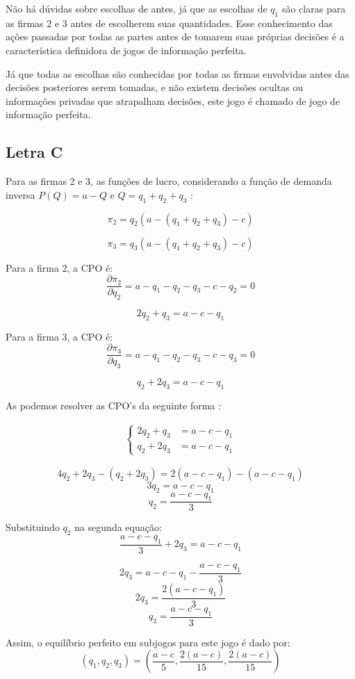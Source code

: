 \documentclass[a4paper,12pt]{article}[abntex2]
\begin{document}
Não há dúvidas sobre escolhas de antes, já que as escolhas de \( q_1 \) são claras para as firmas 2 e 3 antes de escolherem suas quantidades. Esse conhecimento das ações passadas por todas as partes antes de tomarem suas próprias decisões é a característica definidora de jogos de informação perfeita.

Já que todas as escolhas são conhecidas por todas as firmas envolvidas antes das decisões posteriores serem tomadas, e não existem decisões ocultas ou informações privadas que atrapalham decisões, este jogo é chamado de jogo de informação perfeita.

\subsection{\textbf{Letra C}}
Para as firmas 2 e 3, as funções de lucro, considerando a função de demanda inversa \(P(Q) = a - Q\) e \(Q = q_1 + q_2 + q_3\) :

\[\pi_2 = q_2 \left(a - (q_1 + q_2 + q_3) - c\right)\]

\[\pi_3 = q_3 \left(a - (q_1 + q_2 + q_3) - c\right)\]

Para a firma 2, a CPO é:
\[\frac{\partial \pi_2}{\partial q_2} = a - q_1 - q_2 - q_3 - c - q_2 = 0\]

\[2q_2 + q_3 = a - c - q_1\]

Para a firma 3, a CPO é:
\[\frac{\partial \pi_3}{\partial q_3} = a - q_1 - q_2 - q_3 - c - q_3 = 0\]

\[q_2 + 2q_3 = a - c - q_1\]

As podemos resolver as CPO's da seguinte forma : 

\begin{align}
\left\{
\begin{array}{ll}
2q_2 + q_3 &= a - c - q_1 \\
q_2 + 2q_3 &= a - c - q_1
\end{array}
\right.
\end{align}


\[4q_2 + 2q_3 - (q_2 + 2q_3) = 2(a - c - q_1) - (a - c - q_1)\]
\[3q_2 = a - c - q_1\]
\[q_2 = \frac{a - c - q_1}{3}\]

Substituindo \(q_2\) na segunda equação:
\[\frac{a - c - q_1}{3} + 2q_3 = a - c - q_1\]

\[2q_3 = a - c - q_1 - \frac{a - c - q_1}{3}\]
\[2q_3 = \frac{2(a - c - q_1)}{3}\]
\[q_3 = \frac{a - c - q_1}{3}\]

Assim, o equilíbrio perfeito em subjogos para este jogo é dado por:
\[(q_1, q_2, q_3) = \left(\frac{a - c}{5}, \frac{2(a - c)}{15}, \frac{2(a - c)}{15}\right)\]
\end{document}
